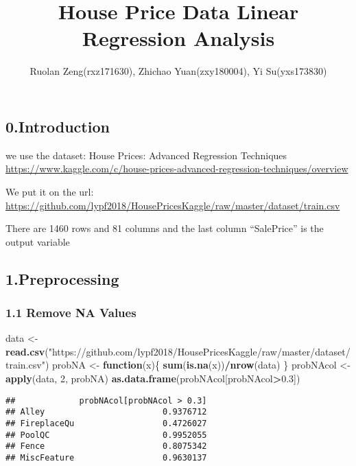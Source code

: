 \documentclass[]{article}
\title{House Price Data Linear Regression Analysis}
\author{Ruolan Zeng(rxz171630), Zhichao Yuan(zxy180004), Yi Su(yxs173830)}
\date{}
\newenvironment{Shaded}{\begin{snugshade}}{\end{snugshade}}
\newcommand{\KeywordTok}[1]{\textcolor[rgb]{0.13,0.29,0.53}{\textbf{#1}}}
\newcommand{\DecValTok}[1]{\textcolor[rgb]{0.00,0.00,0.81}{#1}}
\newcommand{\FloatTok}[1]{\textcolor[rgb]{0.00,0.00,0.81}{#1}}
\newcommand{\StringTok}[1]{\textcolor[rgb]{0.31,0.60,0.02}{#1}}
\newcommand{\ControlFlowTok}[1]{\textcolor[rgb]{0.13,0.29,0.53}{\textbf{#1}}}
\newcommand{\OperatorTok}[1]{\textcolor[rgb]{0.81,0.36,0.00}{\textbf{#1}}}
\newcommand{\NormalTok}[1]{#1}
\begin{document}
\maketitle

\subsection{0.Introduction}\label{introduction}

we use the dataset: House Prices: Advanced Regression Techniques
\url{https://www.kaggle.com/c/house-prices-advanced-regression-techniques/overview}

We put it on the url:
\url{https://github.com/lypf2018/HousePricesKaggle/raw/master/dataset/train.csv}

There are 1460 rows and 81 columns and the last column ``SalePrice'' is
the output variable

\subsection{1.Preprocessing}\label{preprocessing}

\subsubsection{1.1 Remove NA Values}\label{remove-na-values}

\begin{Shaded}
\begin{Highlighting}[]
\NormalTok{data <-}\StringTok{ }\KeywordTok{read.csv}\NormalTok{(}\StringTok{"https://github.com/lypf2018/HousePricesKaggle/raw/master/dataset/train.csv"}\NormalTok{)}
\NormalTok{probNA <-}\StringTok{ }\ControlFlowTok{function}\NormalTok{(x)\{}
  \KeywordTok{sum}\NormalTok{(}\KeywordTok{is.na}\NormalTok{(x))}\OperatorTok{/}\KeywordTok{nrow}\NormalTok{(data)}
\NormalTok{\}}
\NormalTok{probNAcol <-}\StringTok{ }\KeywordTok{apply}\NormalTok{(data, }\DecValTok{2}\NormalTok{, probNA)}
\KeywordTok{as.data.frame}\NormalTok{(probNAcol[probNAcol}\OperatorTok{>}\FloatTok{0.3}\NormalTok{])}
\end{Highlighting}
\end{Shaded}

\begin{verbatim}
##             probNAcol[probNAcol > 0.3]
## Alley                        0.9376712
## FireplaceQu                  0.4726027
## PoolQC                       0.9952055
## Fence                        0.8075342
## MiscFeature                  0.9630137
\end{verbatim}
\end{document}
